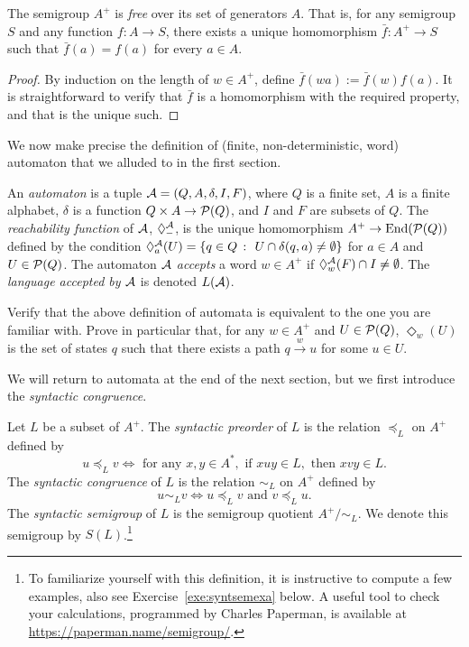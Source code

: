 \begin{proposition}\label{prop:free}
  The semigroup $A^+$ is \emph{free} over its set of generators $A$. That is, for any semigroup $S$ and any function $f \colon A \to S$, there exists a unique homomorphism $\bar{f} \colon A^+ \to S$ such that $\bar{f}(a) = f(a)$ for every $a \in A$.
\end{proposition}
\begin{proof}
By induction on the length of $w \in A^+$, define $\bar{f}(wa) := \bar{f}(w) f(a)$. It is straightforward to verify that $\bar{f}$ is a homomorphism with the required property, and that is the unique such.
\end{proof}
We now make precise the definition of (finite, non-deterministic, word) automaton that we alluded to in the first section.
\begin{definition}\label{def:automaton}
  An \emph{automaton} is a tuple $\mathcal{A} = (Q, A, \delta, I, F)$, where $Q$ is a finite set, $A$ is a finite alphabet, $\delta$ is a function $Q \times A \to \mathcal{P}(Q)$, and $I$ and $F$ are subsets of $Q$. The \emph{reachability function} of $\mathcal{A}$, $\Diamond^{\mathcal{A}}_{-}$, is the unique homomorphism $A^+ \to \mathrm{End}(\mathcal{P}(Q))$ defined by the condition $\Diamond^{\mathcal{A}}_a(U) = \{q \in Q \ \colon \ U \cap \delta(q,a) \neq \emptyset\}$ for $a \in A$ and $U \in \mathcal{P}(Q)$. The automaton $\mathcal{A}$ \emph{accepts} a word $w \in A^+$ if $\Diamond^{\mathcal{A}}_w(F) \cap I \neq \emptyset$. The \emph{language accepted by $\mathcal{A}$} is denoted $L(\mathcal{A})$.
\end{definition}
\begin{exercise}\easy
  Verify that the above definition of automata is equivalent to the one you are familiar with. Prove in particular that, for any $w \in A^+$ and $U \in \mathcal{P}(Q)$,  $\Diamond_w(U)$ is the set of states $q$ such that there exists a path $q \stackrel{w}{\to} u$ for some $u \in U$.
\end{exercise}
We will return to automata at the end of the next section, but we first introduce the \emph{syntactic congruence}.
\begin{definition}
  Let $L$ be a subset of $A^+$. The \emph{syntactic preorder} of $L$ is the relation $\preceq_L$ on $A^+$ defined by 
  \[ u \preceq_L v \iff \text{ for any } x,y \in A^*, \text{ if } xuy \in L, \text{ then } xvy \in L.\]
% 
  The \emph{syntactic congruence} of $L$ is the relation $\sim_L$ on $A^+$ defined by
  \[ u \sim_L v \iff u \preceq_L v \text{ and } v \preceq_L u.\]
The \emph{syntactic semigroup} of $L$ is the semigroup quotient $A^+/{\sim_L}$. We denote this semigroup by $S(L)$.\footnote{To familiarize yourself with this definition, it is instructive to compute a few examples, also see Exercise~\ref{exe:syntsemexa} below. A useful tool to check your calculations, programmed by Charles Paperman, is available at \url{https://paperman.name/semigroup/}.}
\end{definition}
